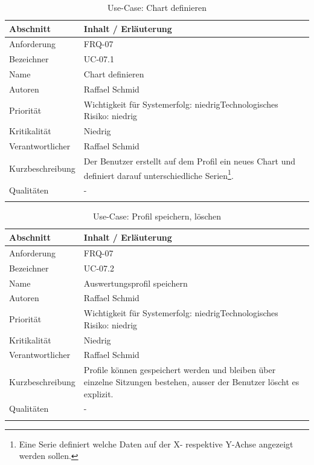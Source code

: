 \begin{longtable}{|p{4cm}|p{10.5cm}|}
\hline
   \textbf{Abschnitt} & \textbf{Inhalt / Erläuterung} \\\hline
   Anforderung & FRQ-07\\\hline
   Bezeichner & UC-07.1\\\hline
   Name & Chart definieren\\\hline
   Autoren & Raffael Schmid\\\hline
   Priorität & Wichtigkeit für Systemerfolg: niedrig\newline Technologisches Risiko: niedrig\\\hline
   Kritikalität & Niedrig\\\hline
   Verantwortlicher & Raffael Schmid\\\hline
   Kurzbeschreibung & Der Benutzer erstellt auf dem Profil ein neues Chart und definiert darauf unterschiedliche Serien\footnote{Eine Serie definiert welche Daten auf der X- respektive Y-Achse angezeigt werden sollen.}.\\\hline
   Qualitäten & -\\\hline
\caption{Use-Case: Chart definieren }
\end{longtable}

\begin{longtable}{|p{4cm}|p{10.5cm}|}
\hline
   \textbf{Abschnitt} & \textbf{Inhalt / Erläuterung} \\\hline
   Anforderung & FRQ-07\\\hline
   Bezeichner & UC-07.2\\\hline
   Name & Auswertungsprofil speichern\\\hline
   Autoren & Raffael Schmid\\\hline
   Priorität & Wichtigkeit für Systemerfolg: niedrig\newline Technologisches Risiko: niedrig\\\hline
   Kritikalität & Niedrig\\\hline
   Verantwortlicher & Raffael Schmid\\\hline
   Kurzbeschreibung & Profile können gespeichert werden und bleiben über einzelne Sitzungen bestehen, ausser der Benutzer löscht es explizit.\\\hline
   Qualitäten & -\\\hline
\caption{Use-Case: Profil speichern, löschen }
\end{longtable}


